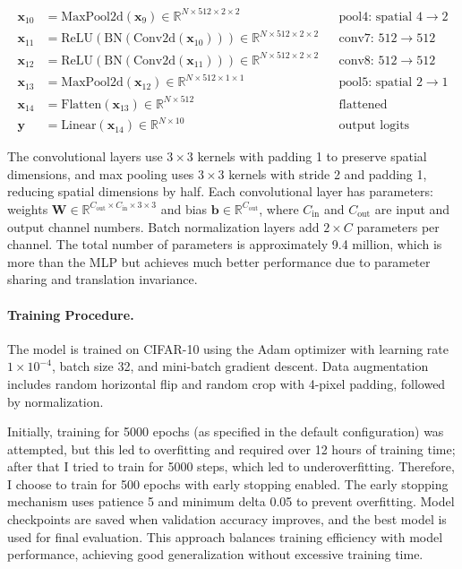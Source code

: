 \documentclass[11pt,a4paper]{article}
\begin{document}
\begin{align*}
\mathbf{x}_{10} &= \text{MaxPool2d}(\mathbf{x}_9) \in \mathbb{R}^{N \times 512 \times 2 \times 2} && \text{pool4: spatial } 4 \rightarrow 2 \\
\mathbf{x}_{11} &= \text{ReLU}(\text{BN}(\text{Conv2d}(\mathbf{x}_{10}))) \in \mathbb{R}^{N \times 512 \times 2 \times 2} && \text{conv7: } 512 \rightarrow 512 \\
\mathbf{x}_{12} &= \text{ReLU}(\text{BN}(\text{Conv2d}(\mathbf{x}_{11}))) \in \mathbb{R}^{N \times 512 \times 2 \times 2} && \text{conv8: } 512 \rightarrow 512 \\
\mathbf{x}_{13} &= \text{MaxPool2d}(\mathbf{x}_{12}) \in \mathbb{R}^{N \times 512 \times 1 \times 1} && \text{pool5: spatial } 2 \rightarrow 1 \\
\mathbf{x}_{14} &= \text{Flatten}(\mathbf{x}_{13}) \in \mathbb{R}^{N \times 512} && \text{flattened} \\
\mathbf{y} &= \text{Linear}(\mathbf{x}_{14}) \in \mathbb{R}^{N \times 10} && \text{output logits}
\end{align*}

The convolutional layers use $3 \times 3$ kernels with padding 1 to preserve spatial dimensions, and max pooling uses $3 \times 3$ kernels with stride 2 and padding 1, reducing spatial dimensions by half. Each convolutional layer has parameters: weights $\mathbf{W} \in \mathbb{R}^{C_{\text{out}} \times C_{\text{in}} \times 3 \times 3}$ and bias $\mathbf{b} \in \mathbb{R}^{C_{\text{out}}}$, where $C_{\text{in}}$ and $C_{\text{out}}$ are input and output channel numbers. Batch normalization layers add $2 \times C$ parameters per channel. The total number of parameters is approximately 9.4 million, which is more than the MLP but achieves much better performance due to parameter sharing and translation invariance.

\paragraph{Training Procedure.} The model is trained on CIFAR-10 using the Adam optimizer with learning rate $1 \times 10^{-4}$, batch size 32, and mini-batch gradient descent. Data augmentation includes random horizontal flip and random crop with 4-pixel padding, followed by normalization. 

Initially, training for 5000 epochs (as specified in the default configuration) was attempted, but this led to overfitting and required over 12 hours of training time; after that I tried to train for 5000 steps, which led to underoverfitting. Therefore, I choose to train for 500 epochs with early stopping enabled. The early stopping mechanism uses patience 5 and minimum delta 0.05 to prevent overfitting. Model checkpoints are saved when validation accuracy improves, and the best model is used for final evaluation. This approach balances training efficiency with model performance, achieving good generalization without excessive training time.
\end{document}
